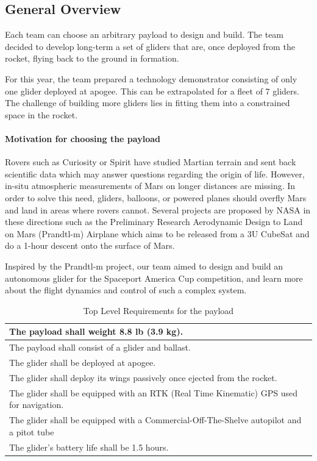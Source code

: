 \subsection{General Overview}

Each team can choose an arbitrary payload to design and build. The team decided to develop long-term a set of gliders that are, once deployed from the rocket, flying back to the ground in formation. 


For this year, the team prepared a technology demonstrator consisting of only one glider deployed at apogee. This can be extrapolated for a fleet of 7 gliders. The challenge of building more gliders lies in fitting them into a constrained space in the rocket. 

\paragraph{Motivation for choosing the payload}
\hfill \break
Rovers such as Curiosity or Spirit have studied Martian terrain and sent back scientific data which may answer questions regarding the origin of life. However, in-situ atmospheric measurements of Mars on longer distances are missing. In order to solve this need, gliders, balloons, or powered planes should overfly Mars and land in areas where rovers cannot. Several projects are proposed by NASA in these directions such as the Preliminary Research Aerodynamic Design to Land on Mars (Prandtl-m) Airplane which aims to be released from a 3U CubeSat and do a 1-hour descent onto the surface of Mars.

Inspired by the Prandtl-m project, our team aimed to design and build an autonomous glider for the Spaceport America Cup competition, and learn more about the flight dynamics and control of such a complex system.


\begin{table}[h!]
\centering
\begin{tabular}{|p{}|}
\hline
    The payload shall weight 8.8 lb (3.9 kg). \\ \hline
    The payload shall consist of a glider and ballast.  \\ \hline
    The glider shall be deployed at apogee. \\ \hline
    The glider shall deploy its wings passively once ejected from the rocket. \\ \hline
    The glider shall be equipped with an RTK (Real Time Kinematic) GPS used for navigation. \\ \hline
    The glider shall be equipped with a Commercial-Off-The-Shelve autopilot and a pitot tube \\ \hline
    The glider's battery life shall be 1.5 hours. \\ \hline
\end{tabular}
\caption{Top Level Requirements for the payload}
\label{table:se_topLevelR}
\end{table}


